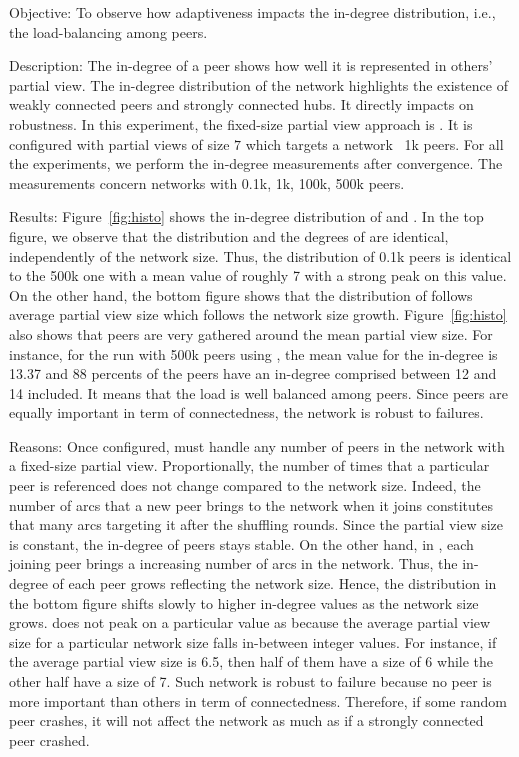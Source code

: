 \begin{asparadesc}
\item[Objective:] To observe how adaptiveness impacts the in-degree
  distribution, i.e., the load-balancing among peers.
\item[Description:] The in-degree of a peer shows how well it is represented in
  others' partial view. The in-degree distribution of the network highlights the
  existence of weakly connected peers and strongly connected hubs. It directly
  impacts on robustness. In this experiment, the fixed-size partial view
  approach is \CYCLON{}. It is configured with partial views of size $7$ which
  targets a network ~1k peers.  For all the experiments, we perform the
  in-degree measurements after convergence. The measurements concern networks
  with 0.1k, 1k, 100k, 500k peers.
\item[Results:] Figure~\ref{fig:histo} shows the in-degree distribution of
  \CYCLON and \SPRAY. In the top figure, we observe that the distribution and
  the degrees of \CYCLON are identical, independently of the network
  size. Thus, the distribution of 0.1k peers is identical to the 500k one with
  a mean value of roughly 7 with a strong peak on this value. On the other
  hand, the bottom figure shows that the distribution of \SPRAY follows average
  partial view size which follows the network size
  growth. Figure~\ref{fig:histo} also shows that peers are very gathered around
  the mean partial view size. For instance, for the run with 500k peers using
  \SPRAY, the mean value for the in-degree is 13.37 and 88 percents of the
  peers have an in-degree comprised between 12 and 14 included. It means that
  the load is well balanced among peers. Since peers are equally important in
  term of connectedness, the network is robust to failures.
\item[Reasons:] Once configured, \CYCLON must handle any number of peers in the
  network with a fixed-size partial view. Proportionally, the number of times
  that a particular peer is referenced does not change compared to the network
  size. Indeed, the number of arcs that a new peer brings to the network when it
  joins constitutes that many arcs targeting it after the shuffling
  rounds. Since the partial view size is constant, the in-degree of peers stays
  stable. On the other hand, in \SPRAY, each joining peer brings a increasing
  number of arcs in the network. Thus, the in-degree of each peer grows
  reflecting the network size. Hence, the distribution in the bottom figure
  shifts slowly to higher in-degree values as the network size grows.  \SPRAY
  does not peak on a particular value as \CYCLON because the average partial
  view size for a particular network size falls in-between integer values. For
  instance, if the average partial view size is 6.5, then half of them have a
  size of 6 while the other half have a size of 7. Such network is robust to
  failure because no peer is more important than others in term of
  connectedness. Therefore, if some random peer crashes, it will not affect the
  network as much as if a strongly connected peer crashed.
\end{asparadesc}

